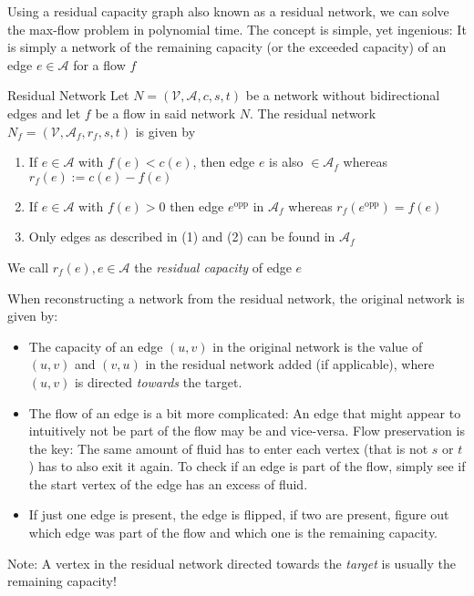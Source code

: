 
Using a residual capacity graph also known as a residual network, we can solve the max-flow problem in polynomial time.
The concept is simple, yet ingenious: It is simply a network of the remaining capacity (or the exceeded capacity) of an edge $e \in \mathcal{A}$ for a flow $f$

\begin{definition}[]{Residual Network}
    Let $N = (\mathcal{V}, \mathcal{A}, c, s, t)$ be a network without bidirectional edges and let $f$ be a flow in said network $N$. The residual network $N_f = (\mathcal{V}, \mathcal{A}_f, r_f, s, t)$ is given by
    \begin{enumerate}[label=(\arabic*)]
        \item If $e \in \mathcal{A}$ with $f(e) < c(e)$, then edge $e$ is also $\in \mathcal{A}_f$ whereas $r_f(e) := c(e) - f(e)$
        \item If $e \in \mathcal{A}$ with $f(e) > 0$ then edge $e^{\text{opp}}$ in $\mathcal{A}_f$ whereas $r_f(e^{\text{opp}}) = f(e)$
        \item Only edges as described in (1) and (2) can be found in $\mathcal{A}_f$
    \end{enumerate}

    We call $r_f(e), e \in \mathcal{A}$ the \textit{residual capacity} of edge $e$
\end{definition}

When reconstructing a network from the residual network, the original network is given by:
\begin{itemize}
    \item The capacity of an edge $(u, v)$ in the original network is the value of $(u, v)$ and $(v, u)$ in the residual network added (if applicable), where $(u, v)$ is directed \textit{towards} the target.
    \item The flow of an edge is a bit more complicated: An edge that might appear to intuitively not be part of the flow may be and vice-versa.
          Flow preservation is the key: The same amount of fluid has to enter each vertex (that is not $s$ or $t$) has to also exit it again.
          To check if an edge is part of the flow, simply see if the start vertex of the edge has an excess of fluid.
    \item If just one edge is present, the edge is flipped, if two are present, figure out which edge was part of the flow and which one is the remaining capacity.
\end{itemize}
Note: A vertex in the residual network directed towards the \textit{target} is usually the remaining capacity!

